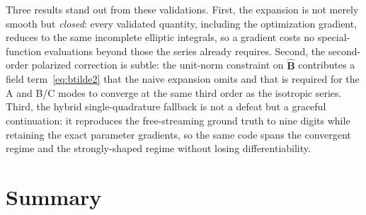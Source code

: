\documentclass[11pt]{article}
\newcommand{\Bhat}{\hat{\bm{B}}}
\begin{document}
Three results stand out from these validations. First, the expansion is not merely smooth but \emph{closed}: every validated quantity, including the optimization gradient, reduces to the same incomplete elliptic integrals, so a gradient costs no special-function evaluations beyond those the series already requires. Second, the second-order polarized correction is subtle: the unit-norm constraint on $\Bhat$ contributes a field term~\eqref{eq:btilde2} that the naive expansion omits and that is required for the A and B/C modes to converge at the same third order as the isotropic series. Third, the hybrid single-quadrature fallback is not a defeat but a graceful continuation: it reproduces the free-streaming ground truth to nine digits while retaining the exact parameter gradients, so the same code spans the convergent regime and the strongly-shaped regime without losing differentiability.

\section{Summary}
\label{sec:summary}
\end{document}
